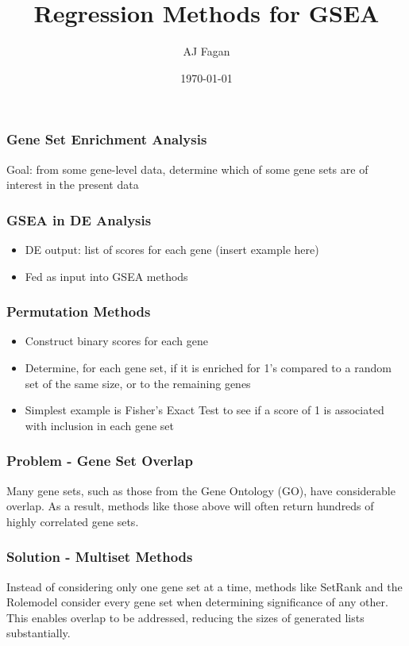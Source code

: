 \documentclass{beamer}
\title{Regression Methods for GSEA}
\date{\today}
\author{AJ Fagan}
\begin{document}
\maketitle

\begin{frame}
  \frametitle{Gene Set Enrichment Analysis}
  Goal: from some gene-level data, determine which of some gene sets are of interest in the present data
\end{frame}

\begin{frame}
  \frametitle{GSEA in DE Analysis}

  \begin{itemize}
    \item DE output: list of scores for each gene (insert example here)
    \item Fed as input into GSEA methods 
  \end{itemize}
\end{frame}

\begin{frame}
  \frametitle{Permutation Methods}
  \begin{itemize}
    \item Construct binary scores for each gene
    \item Determine, for each gene set, if it is enriched for 1's compared to a random set of the same size, or to the remaining genes
    \item Simplest example is Fisher's Exact Test to see if a score of 1 is associated with inclusion in each gene set 
  \end{itemize}
\end{frame}

\begin{frame}
  \frametitle{Problem - Gene Set Overlap}

  Many gene sets, such as those from the Gene Ontology (GO), have considerable overlap.
  As a result, methods like those above will often return hundreds of highly correlated gene sets.
\end{frame}

\begin{frame}
  \frametitle{Solution - Multiset Methods}

  Instead of considering only one gene set at a time, methods like SetRank and the Rolemodel consider every gene set when determining significance of any other.
  This enables overlap to be addressed, reducing the sizes of generated lists substantially.
\end{frame}
\end{document}
